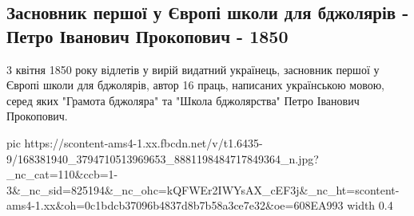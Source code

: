  
 
 
 
 

\subsection{Засновник першої у Європі школи для бджолярів - Петро Іванович Прокопович - 1850}

3 квітня 1850 року відлетів у вирій видатний українець, засновник першої у Європі школи для бджолярів, автор 16 праць, написаних українською мовою, серед яких "Грамота бджоляра" та "Школа бджолярства" Петро Іванович Прокопович.

\ifcmt
  pic https://scontent-ams4-1.xx.fbcdn.net/v/t1.6435-9/168381940_3794710513969653_8881198484717849364_n.jpg?_nc_cat=110&ccb=1-3&_nc_sid=825194&_nc_ohc=kQFWEr2IWYsAX_cEF3j&_nc_ht=scontent-ams4-1.xx&oh=0c1bdcb37096b4837d8b7b58a3ce7e32&oe=608EA993
  width 0.4
\fi


